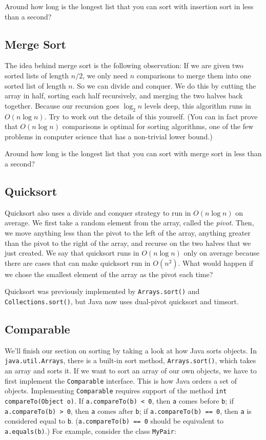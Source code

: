 Around how long is the longest list that you can sort with insertion sort in less than a second?

\subsection{Merge Sort}

The idea behind merge sort is the following observation: If we are given two sorted lists of length $n/2$, we only need $n$ comparisons to merge them into one sorted list of length $n$. So we can divide and conquer. We do this by cutting the array in half, sorting each half recursively, and merging the two halves back together. Because our recursion goes $\log_2 n$ levels deep, this algorithm runs in $O(n \log n)$. Try to work out the details of this yourself. (You can in fact prove that $O(n \log n)$ comparisons is optimal for sorting algorithms, one of the few problems in computer science that has a non-trivial lower bound.)

Around how long is the longest list that you can sort with merge sort in less than a second?

\subsection{Quicksort}

Quicksort also uses a divide and conquer strategy to run in $O(n \log n)$ on average. We first take a random element from the array, called the \emph{pivot}. Then, we move anything less than the pivot to the left of the array, anything greater than the pivot to the right of the array, and recurse on the two halves that we just created. We say that quicksort runs in $O(n \log n)$ only on average because there are cases that can make quicksort run in $O(n^2)$. What would happen if we chose the smallest element of the array as the pivot each time?

Quicksort was previously implemented by \texttt{Arrays.sort()} and \texttt{Collections.sort()}, but Java now uses dual-pivot quicksort and timsort.

\subsection{Comparable}

We'll finish our section on sorting by taking a look at how Java sorts objects. In \texttt{java.util.Arrays}, there is a built-in sort method, \texttt{Arrays.sort()}, which takes an array and sorts it. If we want to sort an array of our own objects, we have to first implement the \texttt{Comparable} interface. This is how Java orders a set of objects. Implementing \texttt{Comparable} requires support of the method \texttt{int compareTo(Object o)}. If \texttt{a.compareTo(b) < 0}, then \texttt{a} comes before \texttt{b}; if \texttt{a.compareTo(b) > 0}, then \texttt{a} comes after \texttt{b}; if \texttt{a.compareTo(b) == 0}, then \texttt{a} is considered equal to \texttt{b}. (\texttt{a.compareTo(b) == 0} should be equivalent to \texttt{a.equals(b)}.) For example, consider the class \texttt{MyPair}:

